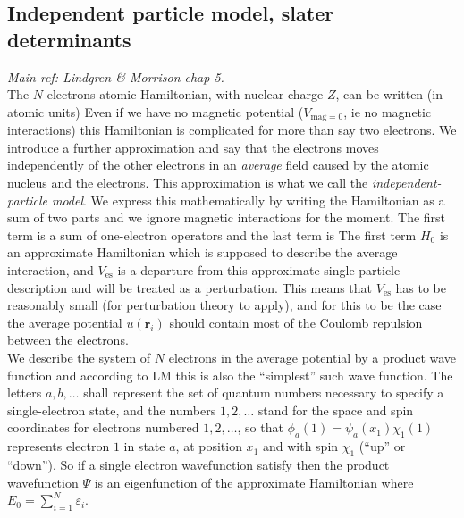 \subsection{Independent particle model, slater determinants}
\newcommand{\slater}[1]{\{#1\}}
\emph{Main ref: Lindgren \& Morrison chap 5.}\\
The $N$-electrons atomic Hamiltonian, with nuclear charge $Z$, can be written (in atomic units)
Even if we have no magnetic potential ($V_{\text{mag} = 0}$, ie no magnetic interactions) this Hamiltonian is complicated for more than say two electrons.
We introduce a further approximation and say that the electrons moves independently of the other electrons in an \emph{average} field caused by the atomic nucleus and the electrons.
This approximation is what we call the \emph{independent-particle model}. We express this mathematically by writing the Hamiltonian as a sum of two parts
and we ignore magnetic interactions for the moment. The first term
is a sum of one-electron operators
and the last term is
The first term $H_0$ is an approximate Hamiltonian which is supposed to describe the average interaction, and $V_{\text{es}}$ is a departure from this approximate single-particle description and will be treated as a perturbation. This means that $V_{\text{es}}$ has to be reasonably small (for perturbation theory to apply), and for this to be the case the average potential $u(\bm{r}_i)$ should contain most of the Coulomb repulsion between the electrons.\\
\indent We describe the system of $N$ electrons in the average potential by a product wave function
and according to LM this is also the ``simplest'' such wave function. The letters $a,b,\dots$ shall represent the set of quantum numbers necessary to specify a single-electron state, and the numbers $1,2,\dots$ stand for the space and spin coordinates for electrons numbered $1,2,\dots$, so that $\phi_a(1) = \psi_a(x_1)\chi_1(1)$ represents electron $1$ in state $a$, at position $x_1$ and with spin $\chi_1$ (``up'' or ``down''). So if a single electron wavefunction satisfy
then the product wavefunction $\Psi$ is an eigenfunction of the approximate Hamiltonian
where $E_0 = \sum_{i=1}^N \varepsilon_i$. 
